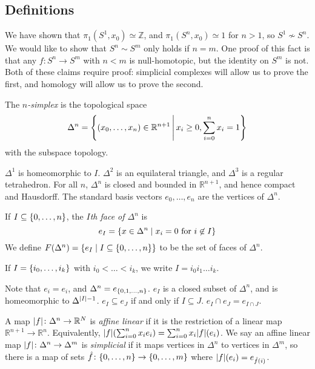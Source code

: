 \subsection{Definitions}
We have shown that \( \pi_1(S^1,x_0) \simeq \mathbb Z \), and \( \pi_1(S^n,x_0) \simeq 1 \) for \( n > 1 \), so \( S^1 \not\sim S^n \).
We would like to show that \( S^n \sim S^m \) only holds if \( n = m \).
One proof of this fact is that any \( f \colon S^n \to S^m \) with \( n < m \) is null-homotopic, but the identity on \( S^m \) is not.
Both of these claims require proof: simplicial complexes will allow us to prove the first, and homology will allow us to prove the second.
\begin{definition}
	The \emph{\( n \)-simplex} is the topological space
	\[ \Delta^n  = \qty{(x_0, \dots, x_n) \in \mathbb R^{n+1} \,\middle|\,x_i \geq 0, \sum_{i=0}^n x_i = 1 } \]
	with the subspace topology.
\end{definition}
\begin{remark}
	\( \Delta^1 \) is homeomorphic to \( I \).
	\( \Delta^2 \) is an equilateral triangle, and \( \Delta^3 \) is a regular tetrahedron.
	For all \( n \), \( \Delta^n \) is closed and bounded in \( \mathbb R^{n+1} \), and hence compact and Hausdorff.
	The standard basis vectors \( e_0, \dots, e_n \) are the vertices of \( \Delta^n \).
\end{remark}
\begin{definition}
	If \( I \subseteq \qty{0, \dots, n} \), the \emph{\( I \)th face of \( \Delta^n \)} is
	\[ e_I = \qty{x \in \Delta^n \mid x_i = 0 \text{ for } i \not\in I} \]
	We define \( F(\Delta^n) = \qty{e_I \mid I \subseteq \qty{0,\dots, n}} \) to be the set of faces of \( \Delta^n \).
\end{definition}
If \( I = \qty{i_0, \dots, i_k} \) with \( i_0 < \dots < i_k \), we write \( I = i_0i_1\dots i_k \).
\begin{remark}
	Note that \( e_{\qty{i}} = e_i \), and \( \Delta^n = e_{\qty{0,1, \dots, n}} \).
	\( e_I \) is a closed subset of \( \Delta^n \), and is homeomorphic to \( \Delta^{\abs{I} - 1} \).
	\( e_I \subseteq e_J \) if and only if \( I \subseteq J \).
	\( e_I \cap e_J = e_{I \cap J} \).
\end{remark}
\begin{definition}
	A map \( \abs{f} \colon \Delta^n \to \mathbb R^N \) is \emph{affine linear} if it is the restriction of a linear map \( \mathbb R^{n+1} \to \mathbb R^n \).
	Equivalently, \( \abs{f}\qty(\sum_{i=0}^n x_i e_i) = \sum_{i=0}^n x_i \abs{f}(e_i) \).
	We say an affine linear map \( \abs{f} \colon \Delta^n \to \Delta^m \) is \emph{simplicial} if it maps vertices in \( \Delta^n \) to vertices in \( \Delta^m \), so there is a map of sets \( \hat f \colon \qty{0,\dots, n} \to \qty{0, \dots, m} \) where \( \abs{f}(e_i) = e_{\hat f(i)} \).
\end{definition}
